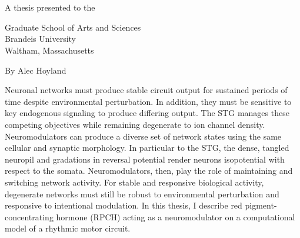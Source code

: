 \begingroup
\let\clearpage\relax
\let\cleardoublepage\relax
\let\cleardoublepage\relax



	\begin{center}
		\large
		
		\begingroup
			 \\ \medskip
			\myTitle \\ \bigskip
		\endgroup
		
		A thesis presented to the \myDepartment \\ \medskip
		
		Graduate School of Arts and Sciences \\
		Brandeis University \\
		Waltham, Massachusetts \\ \medskip
		
		By Alec Hoyland
	
	\end{center}

Neuronal networks must produce stable circuit output for sustained periods of time despite environmental perturbation. In addition, they must be sensitive to key endogenous signaling to produce differing output. The \acs{STG} manages these competing objectives while remaining degenerate to ion channel density. Neuromodulators can produce a diverse set of network states using the same cellular and synaptic morphology. In particular to the \acs{STG}, the dense, tangled neuropil and gradations in reversal potential render neurons isopotential with respect to the somata. Neuromodulators, then, play the role of maintaining and switching network activity. For stable and responsive biological activity, degenerate networks must still be robust to environmental perturbation and responsive to intentional modulation. In this thesis, I describe red pigment-concentrating hormone (\acs{RPCH}) acting as a neuromodulator on a computational model of a rhythmic motor circuit.

\vfill

\endgroup

\vfill
